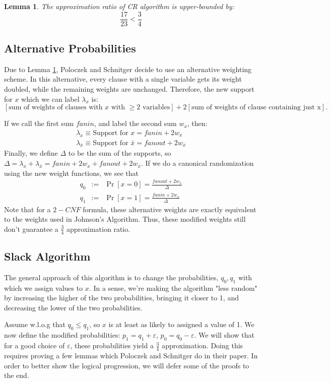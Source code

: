 \documentclass[11pt,letter]{article}
\newtheorem{lemma}{Lemma}
\begin{document}
\begin{lemma}
\label{L:1}
The approximation ratio of CR algorithm is upper-bounded by:
$$\frac{17}{23} < \frac{3}{4}$$

\end{lemma}

\subsection{Alternative Probabilities}
Due to Lemma \ref{L:1}, Poloczek and Schnitger decide to use an alternative weighting scheme. In this alternative, every clause with a single variable gets its weight doubled, while the remaining weights are unchanged. Therefore, the new support for $x$ which we can label $\lambda_x$ is:
$$[\text{sum of weights of clauses with $x$ with $\ge 2$ variables}] + 2[\text{sum of weights of clause containing just x}].$$

If we call the first sum $fanin$, and label the second sum $w_x$, then:
\begin{eqnarray*}
\lambda_x \equiv \text{Support for } x = fanin + 2w_x\\
\lambda_{\bar{x}} \equiv \text{Support for } \bar{x} = fanout + 2w_{\bar{x}}
\end{eqnarray*}
Finally, we define $\Delta$ to be the sum of the supports, so $\Delta = \lambda_{x} + \lambda_{\bar{x}} = fanin + 2w_x + fanout + 2w_{\bar{x}}$. If we do a canonical randomization  using the new weight functions, we see that
\begin{eqnarray*}
q_0 &:=& \Pr[x=0] = \frac{fanout + 2w_{\bar{x}}}{\Delta}\\
q_1 &:=& \Pr[x=1] = \frac{fanin + 2w_x}{\Delta}
\end{eqnarray*}
Note that for a $2-CNF$ formula, these alternative weights are exactly equivalent to the weights used in Johnson's Algorithm. Thus, these modified weights still don't guarantee a $\frac{3}{4}$ approximation ratio.

\subsection{Slack Algorithm}
The general approach of this algorithm is to change the probabilities, $q_0, q_1$ with which we assign values to $x$. In a sense, we're making the algorithm "less random" by increasing the higher of the two probabilities, bringing it closer to 1, and decreasing the lower of the two probabilities.

Assume w.l.o.g that $q_0 \le q_1$, so $x$ is at least as likely to assigned a value of 1. We now define the modified probabilities: $p_1 = q_1 + \varepsilon$, $p_0 = q_0 - \varepsilon$. We will show that for a good choice of $\varepsilon$, these probabilities yield a $\frac{3}{4}$ approximation. Doing this requires proving a few lemmas which Poloczek and Schnitger do in their paper. In order to better show the logical progression, we will defer some of the proofs to the end.
\end{document}
